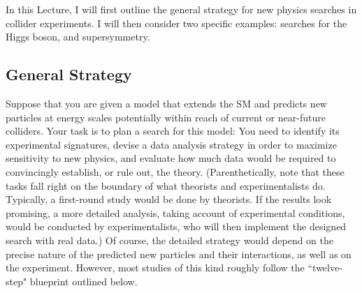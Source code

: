 \documentclass{ws-procs9x6}
\begin{document}
In this Lecture, I will first outline the general strategy for new physics searches in collider experiments. I will then consider two specific examples: searches for the Higgs boson, and supersymmetry.

\subsection{General Strategy}

Suppose that you are given a model that extends the SM and predicts new particles at energy scales potentially within reach of current or near-future colliders. Your task is to plan a search for this model: You need to identify its experimental signatures, devise a data analysis strategy in order to maximize sensitivity to new physics, and evaluate how much data would be required to convincingly establish, or rule out, the theory. (Parenthetically, note that these tasks fall right on the boundary of what theorists and experimentalists do. Typically, a first-round study would be done by theorists. If the results look promising, a more detailed analysis, taking account of experimental conditions, would be conducted by experimentalists, who will then implement the designed search with real data.) Of course, the detailed strategy would depend on the precise nature of the predicted new particles and their interactions, as well as on the experiment. However, most studies of this kind roughly follow the ``twelve-step" blueprint outlined below.
\end{document}
